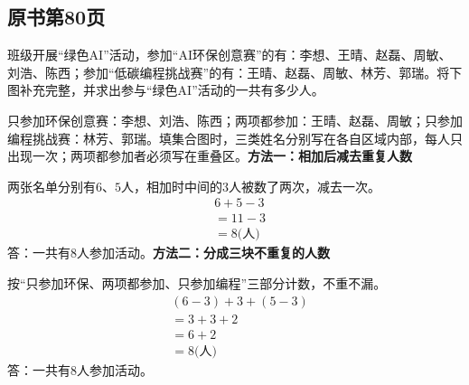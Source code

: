 
\subsection*{原书第80页}

班级开展“绿色AI”活动，参加“AI环保创意赛”的有：李想、王晴、赵磊、周敏、刘浩、陈西；参加“低碳编程挑战赛”的有：王晴、赵磊、周敏、林芳、郭瑞。将下图补充完整，并求出参与“绿色AI”活动的一共有多少人。\par
{}
\begin{BookAnswer}
只参加环保创意赛：李想、刘浩、陈西；两项都参加：王晴、赵磊、周敏；只参加编程挑战赛：林芳、郭瑞。填集合图时，三类姓名分别写在各自区域内部，每人只出现一次；两项都参加者必须写在重叠区。\textbf{方法一：相加后减去重复人数}\par 两张名单分别有\(6\)、\(5\)人，相加时中间的\(3\)人被数了两次，减去一次。\[\begin{aligned}&6+5-3\\&=11-3\\&=8\text{(人)}\end{aligned}\]答：一共有\(8\)人参加活动。\textbf{方法二：分成三块不重复的人数}\par 按“只参加环保、两项都参加、只参加编程”三部分计数，不重不漏。\[\begin{aligned}&(6-3)+3+(5-3)\\&=3+3+2\\&=6+2\\&=8\text{(人)}\end{aligned}\]答：一共有\(8\)人参加活动。
\end{BookAnswer}

